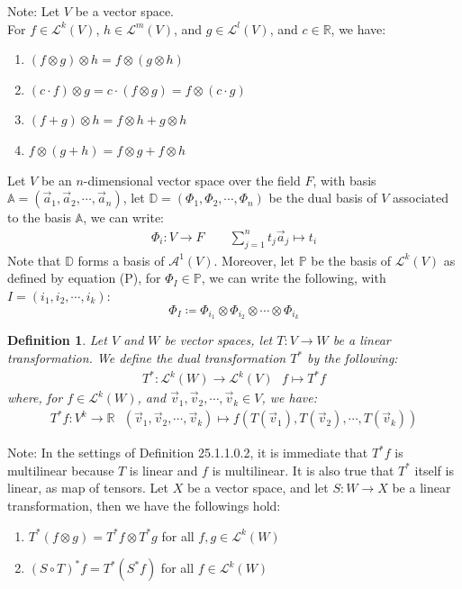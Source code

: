 \documentclass[15pt]{book}
\theoremstyle{break}
\theoremstyle{break}
\newtheorem{defn}{Definition}[corL]
\newcommand{\R}{\mathbb{R}}
\newcommand{\Lt}{\mathcal{L}}
\newcommand{\A}{\mathcal{A}}
\newcommand{\note}{\color{red}Note: \color{black}}
\begin{document}
\note Let $V$ be a vector space. \\
For $f \in \Lt^k(V)$, $h \in \Lt^m(V)$, and $g \in \Lt^l(V)$, and $c \in \R$, we have:
\begin{enumerate}[topsep=3pt,itemsep=-1ex,partopsep=1ex,parsep=1ex]
\item $(f\otimes g) \otimes h = f\otimes (g\otimes h)$
\item $(c\cdot f) \otimes g = c\cdot (f\otimes g) = f\otimes (c\cdot g)$
\item $(f+g) \otimes h = f\otimes h + g\otimes h$
\item $f\otimes (g+h) = f\otimes g+ f\otimes h$\\
\end{enumerate}

Let $V$ be an $n$-dimensional vector space over the field $F$, with basis $\mathbb{A} = (\vec{a}_1,\vec{a}_2,\cdots, \vec{a}_n)$, let $\mathbb{D} = (\Phi_1,\Phi_2,\cdots,\Phi_n)$ be the dual basis of $V$ associated to the basis $\mathbb{A}$, we can write:
\begin{align*}
\Phi_i: V \to F \qquad \sum_{j=1}^n t_j\vec{a}_j \mapsto t_i
\end{align*}
Note that $\mathbb{D}$ forms a basis of $\A^1(V)$. Moreover, let $\mathbb{P}$ be the basis of $\Lt^k(V)$ as defined by equation (P), for $\Phi_I \in \mathbb{P}$, we can write the following, with $I = (i_1,i_2,\cdots, i_k)$: $$\Phi_I \coloneqq \Phi_{i_1}\otimes \Phi_{i_2}\otimes \cdots \otimes \Phi_{i_k}$$

\begin{defn}
Let $V$ and $W$ be vector spaces, let $T:V \to W$ be a linear transformation. We define the dual transformation $T^*$ by the following:
\begin{align*}
T^*:\Lt^k(W) \to \Lt^k(V) \ \ \ f\mapsto T^*f
\end{align*}
where, for $f \in \Lt^k(W)$, and $\vec{v}_1,\vec{v}_2,\cdots, \vec{v}_k \in V$, we have:
\begin{align*}
T^*f:V^k \to \R \ \ \ (\vec{v}_1,\vec{v}_2,\cdots, \vec{v}_k ) \mapsto f\left(T(\vec{v}_1),T(\vec{v}_2),\cdots, T(\vec{v}_k) \right) 
\end{align*}
\end{defn}

\note In the settings of Definition 25.1.1.0.2, it is immediate that $T^*f$ is multilinear because $T$ is linear and $f$ is multilinear. It is also true that $T^*$ itself is linear, as map of tensors. Let $X$ be a vector space, and let $S:W \to X$ be a linear transformation, then we have the followings hold:
\begin{enumerate}[topsep=3pt,itemsep=-1ex,partopsep=1ex,parsep=1ex]
\item $T^*(f\otimes g) = T^*f \otimes T^* g$ for all $f,g \in \Lt^k(W)$
\item $(S\circ T)^*f = T^*(S^*f)$ for all $f \in \Lt^k(W)$
\end{enumerate}
\end{document}
